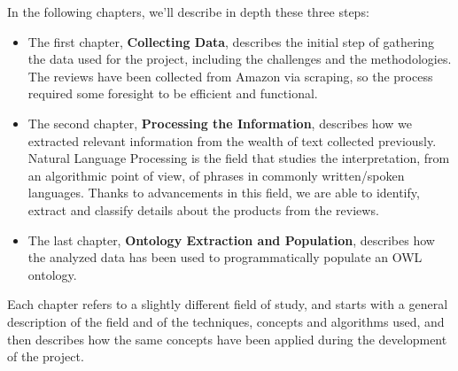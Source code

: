 \documentclass[LaM,binding=0.6cm]{sapthesis}
\begin{document}
 \begin{center}
\end{center}

In the following chapters, we'll describe in depth these three steps:
\begin{itemize}
	\item The first chapter, \textbf{Collecting Data}, describes the initial step of gathering the data used for the project, including the challenges and the methodologies. The reviews have been collected from Amazon via scraping, so the process required some foresight to be efficient and functional.
	\item The second chapter, \textbf{Processing the Information}, describes how we extracted relevant information from the wealth of text collected previously. Natural Language Processing is the field that studies the interpretation, from an algorithmic point of view, of phrases in commonly written/spoken languages. Thanks to advancements in this field, we are able to identify, extract and classify details about the products from the reviews.
	\item The last chapter, \textbf{Ontology Extraction and Population}, describes how the analyzed data has been used to programmatically populate an OWL ontology.
\end{itemize}

Each chapter refers to a slightly different field of study, and starts with a general description of the field and of the techniques, concepts and algorithms used, and then describes how the same concepts have been applied during the development of the project.

 




\end{document}
